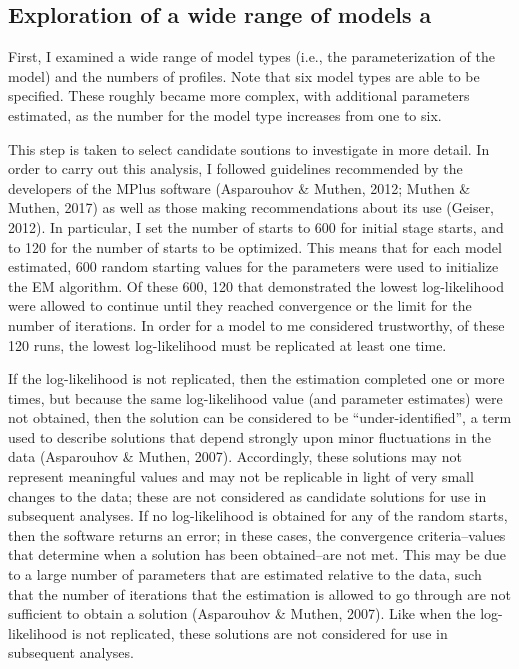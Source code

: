 \documentclass[]{msu-thesis}
\theoremstyle{definition}
\theoremstyle{definition}
\theoremstyle{definition}
\theoremstyle{remark}
\begin{document}
\subsection{Exploration of a wide range of models
a}\label{exploration-of-a-wide-range-of-models-a}

First, I examined a wide range of model types (i.e., the
parameterization of the model) and the numbers of profiles. Note that
six model types are able to be specified. These roughly became more
complex, with additional parameters estimated, as the number for the
model type increases from one to six.

This step is taken to select candidate soutions to investigate in more
detail. In order to carry out this analysis, I followed guidelines
recommended by the developers of the MPlus software (Asparouhov \&
Muthen, 2012; Muthen \& Muthen, 2017) as well as those making
recommendations about its use (Geiser, 2012). In particular, I set the
number of starts to 600 for initial stage starts, and to 120 for the
number of starts to be optimized. This means that for each model
estimated, 600 random starting values for the parameters were used to
initialize the EM algorithm. Of these 600, 120 that demonstrated the
lowest log-likelihood were allowed to continue until they reached
convergence or the limit for the number of iterations. In order for a
model to me considered trustworthy, of these 120 runs, the lowest
log-likelihood must be replicated at least one time.

If the log-likelihood is not replicated, then the estimation completed
one or more times, but because the same log-likelihood value (and
parameter estimates) were not obtained, then the solution can be
considered to be ``under-identified'', a term used to describe solutions
that depend strongly upon minor fluctuations in the data (Asparouhov \&
Muthen, 2007). Accordingly, these solutions may not represent meaningful
values and may not be replicable in light of very small changes to the
data; these are not considered as candidate solutions for use in
subsequent analyses. If no log-likelihood is obtained for any of the
random starts, then the software returns an error; in these cases, the
convergence criteria--values that determine when a solution has been
obtained--are not met. This may be due to a large number of parameters
that are estimated relative to the data, such that the number of
iterations that the estimation is allowed to go through are not
sufficient to obtain a solution (Asparouhov \& Muthen, 2007). Like when
the log-likelihood is not replicated, these solutions are not considered
for use in subsequent analyses.
\end{document}
